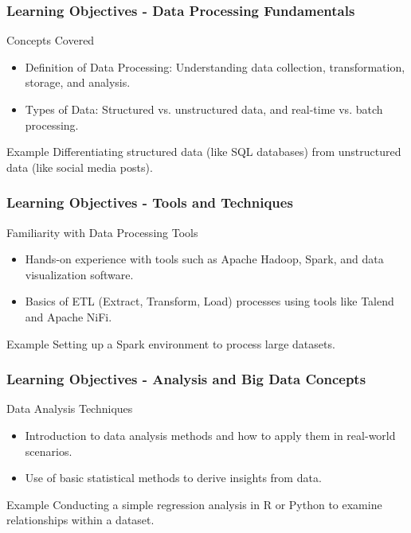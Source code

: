 \documentclass[aspectratio=169]{beamer}
\begin{document}
\begin{frame}[fragile]
\frametitle{Learning Objectives - Data Processing Fundamentals}
\begin{block}{Concepts Covered}
\begin{itemize}
    \item Definition of Data Processing: Understanding data collection, transformation, storage, and analysis.
    \item Types of Data: Structured vs. unstructured data, and real-time vs. batch processing.
\end{itemize}
\end{block}
\begin{block}{Example}
Differentiating structured data (like SQL databases) from unstructured data (like social media posts).
\end{block}
\end{frame}

\begin{frame}[fragile]
\frametitle{Learning Objectives - Tools and Techniques}
\begin{block}{Familiarity with Data Processing Tools}
\begin{itemize}
    \item Hands-on experience with tools such as Apache Hadoop, Spark, and data visualization software.
    \item Basics of ETL (Extract, Transform, Load) processes using tools like Talend and Apache NiFi.
\end{itemize}
\end{block}
\begin{block}{Example}
Setting up a Spark environment to process large datasets.
\end{block}
\end{frame}

\begin{frame}[fragile]
\frametitle{Learning Objectives - Analysis and Big Data Concepts}
\begin{block}{Data Analysis Techniques}
\begin{itemize}
    \item Introduction to data analysis methods and how to apply them in real-world scenarios.
    \item Use of basic statistical methods to derive insights from data.
\end{itemize}
\end{block}
\begin{block}{Example}
Conducting a simple regression analysis in R or Python to examine relationships within a dataset.
\end{block}
\end{frame}
\end{document}
